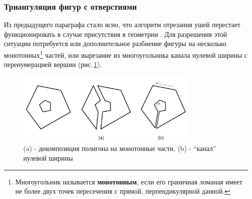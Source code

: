 \documentclass[11pt,a4paper]{extarticle}
\begin{document}
			\subsubsection{Триангуляция фигур с отверстиями}
				Из предыдущего параграфа стало ясно, что алгоритм отрезания ушей перестает функционировать в случае присутствия в геометрии .
				Для разрешения этой ситуации потребуется или дополнительное разбиение фигуры на несколько монотонных\footnote{Многоугольник называется \textbf{монотонным}, если его граничная ломаная имеет не более двух точек пересечения с прямой, перпендикулярной данной.} частей,
				или вырезание из многоугольника канала нулевой ширины с перенумерацией вершин (рис.\,\ref{cutholes}).
				\begin{figure}[ht]
					\centering
					\includegraphics[width=0.8\textwidth]{cutholes}
					\caption{(a) - декомпозиция полигона на монотонные части,
							 (b) - “канал” нулевой ширины}
					\label{cutholes}
				\end{figure}
\end{document}
